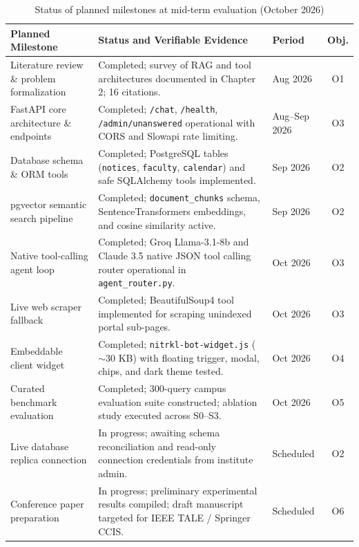 \documentclass[12pt,a4paper]{report}
\begin{document}
\begin{table}[htbp]
\centering
\small
\caption{Status of planned milestones at mid-term evaluation (October 2026)}
\label{tab:progress}
\begin{tabularx}{\textwidth}{lXlc}
\toprule
\textbf{Planned Milestone} & \textbf{Status and Verifiable Evidence} & \textbf{Period} & \textbf{Obj.} \\
\midrule
Literature review \& problem formalization & Completed; survey of RAG and tool architectures documented in Chapter 2; 16 citations. & Aug 2026 & O1 \\
\addlinespace
FastAPI core architecture \& endpoints & Completed; \texttt{/chat}, \texttt{/health}, \texttt{/admin/unanswered} operational with CORS and Slowapi rate limiting. & Aug--Sep 2026 & O3 \\
\addlinespace
Database schema \& ORM tools & Completed; PostgreSQL tables (\texttt{notices}, \texttt{faculty}, \texttt{calendar}) and safe SQLAlchemy tools implemented. & Sep 2026 & O2 \\
\addlinespace
pgvector semantic search pipeline & Completed; \texttt{document\_chunks} schema, SentenceTransformers embeddings, and cosine similarity active. & Sep 2026 & O2 \\
\addlinespace
Native tool-calling agent loop & Completed; Groq Llama-3.1-8b and Claude 3.5 native JSON tool calling router operational in \texttt{agent\_router.py}. & Oct 2026 & O3 \\
\addlinespace
Live web scraper fallback & Completed; BeautifulSoup4 tool implemented for scraping unindexed portal sub-pages. & Oct 2026 & O3 \\
\addlinespace
Embeddable client widget & Completed; \texttt{nitrkl-bot-widget.js} ($\sim$30 KB) with floating trigger, modal, chips, and dark theme tested. & Oct 2026 & O4 \\
\addlinespace
Curated benchmark evaluation & Completed; 300-query campus evaluation suite constructed; ablation study executed across S0--S3. & Oct 2026 & O5 \\
\addlinespace
Live database replica connection & In progress; awaiting schema reconciliation and read-only connection credentials from institute admin. & Scheduled & O2 \\
\addlinespace
Conference paper preparation & In progress; preliminary experimental results compiled; draft manuscript targeted for IEEE TALE / Springer CCIS. & Scheduled & O6 \\
\bottomrule
\end{tabularx}
\end{table}
\end{document}
